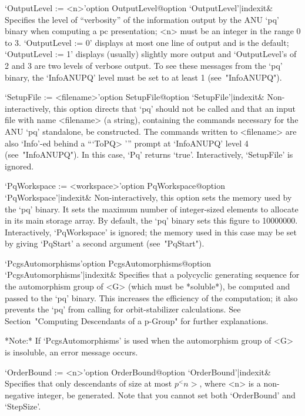 \>`OutputLevel := <n>'{option OutputLevel}@{option `OutputLevel'|indexit}&
Specifies the level of ``verbosity'' of the information output by the ANU
`pq' binary when computing a pc presentation; <n> must be an  integer  in
the range 0 to 3. `OutputLevel := 0' displays at most one line of  output
and is the default; `OutputLevel := 1' displays (usually)  slightly  more
output and `OutputLevel's of 2 and 3 are two levels of verbose output. To
see these messages from the `pq' binary, the `InfoANUPQ'  level  must  be
set to at least 1 (see~"InfoANUPQ").

\>`SetupFile := <filename>'{option SetupFile}@{option `SetupFile'|indexit}&
Non-interactively, this option directs that `pq' should not be called and
that an input file  with  name  <filename>  (a  string),  containing  the
commands necessary for the  ANU  `pq'  standalone,  be  constructed.  The
commands written to <filename> are also `Info'-ed behind  a  ```ToPQ> '''
prompt at `InfoANUPQ' level  4  (see~"InfoANUPQ").  In  this  case,  `Pq'
returns `true'. Interactively, `SetupFile' is ignored.

\>`PqWorkspace := <workspace>'{option PqWorkspace}@{option `PqWorkspace'|indexit}&
Non-interactively, this option sets the memory used by the  `pq'  binary.
It sets the maximum number of integer-sized elements to allocate  in  its
main storage array. By default, the  `pq'  binary  sets  this  figure  to
10000000. Interactively, `PqWorkspace' is ignored;  the  memory  used  in
this  case  may  be  set  by   giving   `PqStart'   a   second   argument
(see~"PqStart").

\>`PcgsAutomorphisms'{option PcgsAutomorphisms}@{option `PcgsAutomorphisms'|indexit}&
Specifies that a polycyclic  generating  sequence  for  the  automorphism
group of <G> (which must be *soluble*), be computed  and  passed  to  the
`pq' binary. This increases the efficiency of the  computation;  it  also
prevents the `pq' from calling {\GAP} for orbit-stabilizer  calculations.
See  Section~"Computing   Descendants   of   a   p-Group"   for   further
explanations.

*Note:*
If `PcgsAutomorphisms' is used when the  automorphism  group  of  <G>  is
insoluble, an error message occurs.

\>`OrderBound := <n>'{option OrderBound}@{option `OrderBound'|indexit}&
Specifies that only descendants of size at most $p^<n>$, where <n>  is  a
non-negative integer,  be  generated.  Note  that  you  cannot  set  both
`OrderBound' and `StepSize'.

